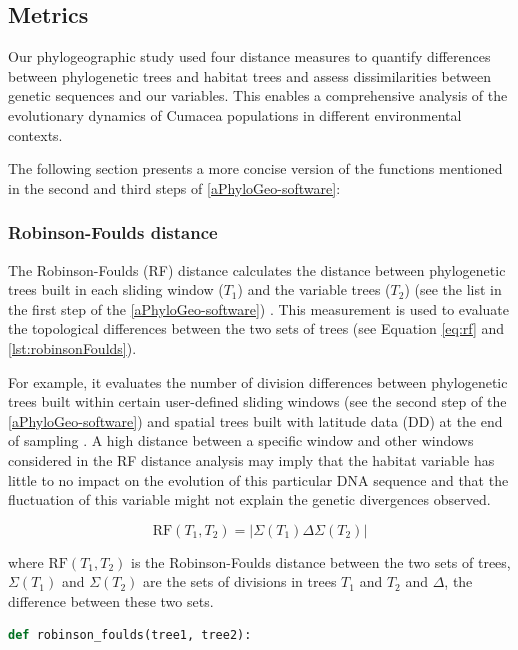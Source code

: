 {\subsection{Metrics}\label{metrics}
Our phylogeographic study used four distance measures to quantify differences between phylogenetic trees and habitat trees and assess dissimilarities between genetic sequences and our variables. This enables a comprehensive analysis of the evolutionary dynamics of Cumacea populations in different environmental contexts.

The following section presents a more concise version of the functions mentioned in the second and third steps of \autoref{aPhyloGeo-software}:

\subsubsection{Robinson-Foulds distance}\label{RF}
The Robinson-Foulds (RF) distance calculates the distance between phylogenetic trees built in each sliding window ($T_1$) and the variable trees ($T_2$) (see the list in the first step of the \autoref{aPhyloGeo-software}) \citep{tahiri2018new, koshkarov_phylogeography_2022}. This measurement is used to evaluate the topological differences between the two sets of trees (see Equation \eqref{eq:rf} and \autoref{lst:robinsonFoulds}).

For example, it evaluates the number of division differences between phylogenetic trees built within certain user-defined sliding windows (see the second step of the \autoref{aPhyloGeo-software}) and spatial trees built with latitude data (DD) at the end of sampling \citep{robinson_comparison_1981}. A high distance between a specific window and other windows considered in the RF distance analysis may imply that the habitat variable has little to no impact on the evolution of this particular DNA sequence and that the fluctuation of this variable might not explain the genetic divergences observed.

\begin{equation}\label{eq:rf}
    \text{RF}(T_1, T_2) = | \Sigma(T_1) \Delta \Sigma(T_2) |
\end{equation}

where $\text{RF}(T_1, T_2)$ is the Robinson-Foulds distance between the two sets of trees, $\Sigma(T_1)$ and $\Sigma(T_2)$ are the sets of divisions in trees $T_1$ and $T_2$ and $ \Delta $, the difference between these two sets.

\begin{lstlisting}[label=lst:robinsonFoulds,language=Python,caption=Python script for calculating the Robinson-Foulds Distance using the ete3 package in the aPhyloGeo package. The Newick format represents the phylogenetic and variable trees in text form.]
def robinson_foulds(tree1, tree2):


\end{lstlisting}}
